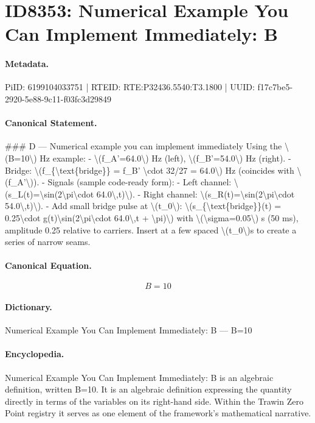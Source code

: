 \section*{ID8353: Numerical Example You Can Implement Immediately: B}
\paragraph{Metadata.}
PiID: 6199104033751 | RTEID: RTE:P32436.5540:T3.1800 | UUID: f17c7be5-2920-5e88-9c11-f03fc3d29849

\paragraph{Canonical Statement.}
\#\#\# D — Numerical example you can implement immediately Using the \textbackslash{}(B=10\textbackslash{}) Hz example: - \textbackslash{}(f\_A'=64.0\textbackslash{}) Hz (left), \textbackslash{}(f\_B'=54.0\textbackslash{}) Hz (right). - Bridge: \textbackslash{}(f\_\{\textbackslash{}text\{bridge\}\} = f\_B' \textbackslash{}cdot 32/27 = 64.0\textbackslash{}) Hz (coincides with \textbackslash{}(f\_A'\textbackslash{})). - Signals (sample code-ready form): - Left channel: \textbackslash{}(s\_L(t)=\textbackslash{}sin(2\textbackslash{}pi\textbackslash{}cdot 64.0\textbackslash{},t)\textbackslash{}). - Right channel: \textbackslash{}(s\_R(t)=\textbackslash{}sin(2\textbackslash{}pi\textbackslash{}cdot 54.0\textbackslash{},t)\textbackslash{}). - Add small bridge pulse at \textbackslash{}(t\_0\textbackslash{}): \textbackslash{}(s\_\{\textbackslash{}text\{bridge\}\}(t) = 0.25\textbackslash{}cdot g(t)\textbackslash{}sin(2\textbackslash{}pi\textbackslash{}cdot 64.0\textbackslash{},t + \textbackslash{}pi)\textbackslash{}) with \textbackslash{}(\textbackslash{}sigma=0.05\textbackslash{}) s (50 ms), amplitude 0.25 relative to carriers. Insert at a few spaced \textbackslash{}(t\_0\textbackslash{})s to create a series of narrow seams.

\paragraph{Canonical Equation.}
\[
B=10
\]

\paragraph{Dictionary.}
Numerical Example You Can Implement Immediately: B — B=10

\paragraph{Encyclopedia.}
Numerical Example You Can Implement Immediately: B is an algebraic definition, written B=10. It is an algebraic definition expressing the quantity directly in terms of the variables on its right-hand side. Within the Trawin Zero Point registry it serves as one element of the framework's mathematical narrative.
